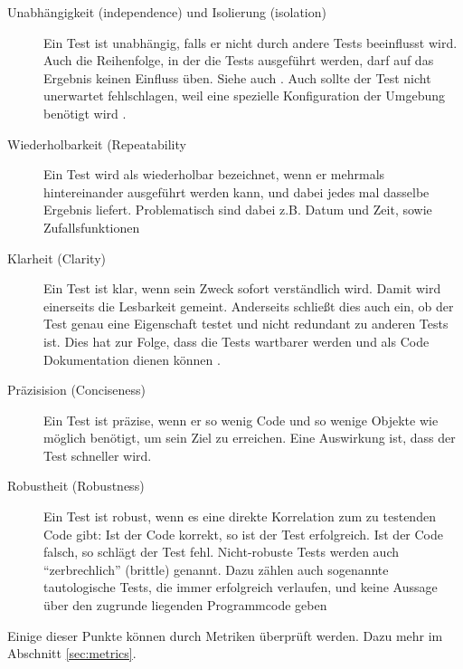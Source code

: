 \begin{description}
 \item[Unabhängigkeit (independence) und Isolierung (isolation)] Ein Test ist unabhängig, falls er nicht durch andere Tests beeinflusst wird. Auch die Reihenfolge, in der die Tests ausgeführt werden, darf auf das Ergebnis keinen Einfluss üben. Siehe auch \citep{beck_test_2002}. Auch sollte der Test nicht unerwartet fehlschlagen, weil eine spezielle Konfiguration der Umgebung benötigt wird \citep{palermo_guidelines_2006}.
 
 \item[Wiederholbarkeit (Repeatability] Ein Test wird als wiederholbar bezeichnet, wenn er mehrmals hintereinander ausgeführt werden kann, und dabei jedes mal dasselbe Ergebnis liefert. Problematisch sind dabei z.B. Datum und Zeit, sowie Zufallsfunktionen
 
 \item[Klarheit (Clarity)] Ein Test ist klar, wenn sein Zweck sofort verständlich wird. Damit wird einerseits die Lesbarkeit gemeint. Anderseits schließt dies auch ein, ob der Test genau eine Eigenschaft testet \citep{palermo_guidelines_2006} und nicht redundant zu anderen Tests ist. Dies hat zur Folge, dass die Tests wartbarer werden und als Code Dokumentation dienen können \citep{rappin_rails_2011}.
 
 \item[Präzisision (Conciseness)] Ein Test ist präzise, wenn er so wenig Code und so wenige Objekte wie möglich benötigt, um sein Ziel zu erreichen. Eine Auswirkung ist, dass der Test schneller wird.
 
 \item[Robustheit (Robustness)] Ein Test ist robust, wenn es eine direkte Korrelation zum zu testenden Code gibt: Ist der Code korrekt, so ist der Test erfolgreich. Ist der Code falsch, so schlägt der Test fehl. Nicht-robuste Tests werden auch "`zerbrechlich"' (brittle) genannt. Dazu zählen auch sogenannte tautologische Tests, die immer erfolgreich verlaufen, und keine Aussage über den zugrunde liegenden Programmcode geben
 \end{description}

Einige dieser Punkte können durch Metriken überprüft werden. Dazu mehr im Abschnitt \ref{sec:metrics}.


